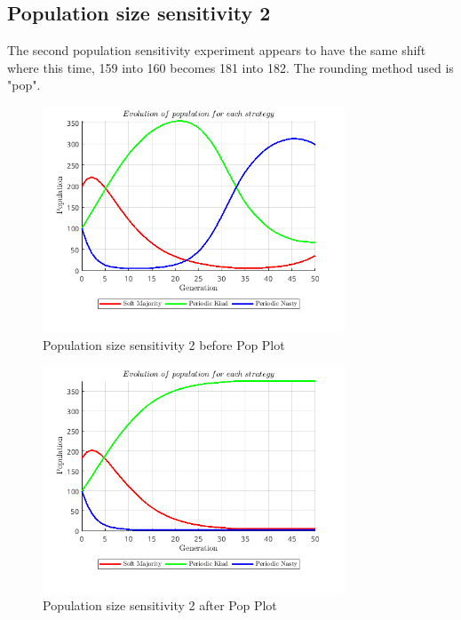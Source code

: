 \documentclass[12pt]{article}
\begin{document}
\subsection{Population size sensitivity 2}
The second population sensitivity experiment appears to have the same shift where this time, 159 into 160 becomes 181 into 182. The rounding method used is "pop".
\begin{figure}[H]
    \centering
    \includegraphics[width=0.8\textwidth]{media/population_size_sensitivity_2_before_pop.png}
    \caption{Population size sensitivity 2 before Pop Plot}
\end{figure}
\begin{figure}[H]
    \centering
    \includegraphics[width=0.8\textwidth]{media/population_size_sensitivity_2_after_pop.png}
    \caption{Population size sensitivity 2 after Pop Plot}
\end{figure}
\end{document}
